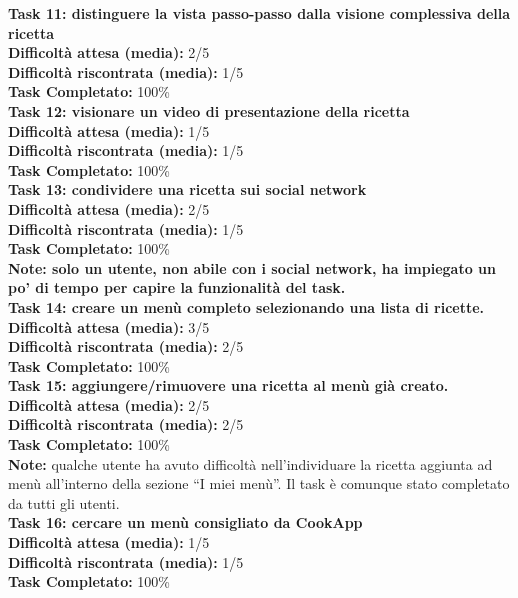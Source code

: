 \begin{itemize}
\textbf{Task 11: distinguere la vista passo-passo dalla visione
complessiva della ricetta}\\
\textbf{Difficoltà attesa (media):} 2/5\\
\textbf{Difficoltà riscontrata (media):} 1/5\\
\textbf{Task Completato:} 100\%\\

\textbf{Task 12: visionare un video di presentazione della ricetta}\\
\textbf{Difficoltà attesa (media):} 1/5\\
\textbf{Difficoltà riscontrata (media):} 1/5\\
\textbf{Task Completato:} 100\%\\

\textbf{Task 13: condividere una ricetta sui social network}\\
\textbf{Difficoltà attesa (media):} 2/5\\
\textbf{Difficoltà riscontrata (media):} 1/5\\
\textbf{Task Completato:} 100\%\\
\textbf{Note: solo un utente, non abile con i social network, ha
impiegato un po' di tempo per capire la funzionalità del task.} \\

\textbf{Task 14: creare un menù completo selezionando una lista di
ricette.}\\
\textbf{Difficoltà attesa (media):} 3/5\\
\textbf{Difficoltà riscontrata (media):} 2/5\\
\textbf{Task Completato:} 100\%\\

\textbf{Task 15: aggiungere/rimuovere una ricetta al menù già creato.}\\
\textbf{Difficoltà attesa (media):} 2/5\\
\textbf{Difficoltà riscontrata (media):} 2/5\\
\textbf{Task Completato:} 100\%\\
\textbf{Note:} qualche utente ha avuto difficoltà nell'individuare la
ricetta aggiunta ad menù all'interno della sezione ``I miei menù''. Il
task è comunque stato completato da tutti gli utenti.\\

\textbf{Task 16: cercare un menù consigliato da CookApp}\\
\textbf{Difficoltà attesa (media):} 1/5\\
\textbf{Difficoltà riscontrata (media):} 1/5\\
\textbf{Task Completato:} 100\%\\


\end{itemize}

